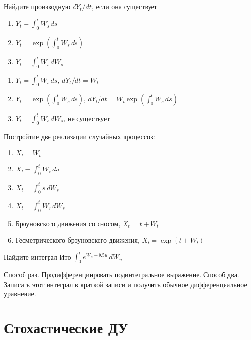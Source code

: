 \begin{problem}
Найдите производную $dY_t/dt$, если она существует
\begin{enumerate}
\item $Y_t=\int_0^t W_s \, ds$
\item $Y_t=\exp (\int_0^t W_s \, ds)$
\item $Y_t=\int_0^t W_s \, dW_s$
\end{enumerate}


\begin{sol}
\begin{enumerate}
\item $Y_t=\int_0^t W_s \, ds$, $dY_t/dt=W_t$
\item $Y_t=\exp (\int_0^t W_s \, ds)$, $dY_t/dt=W_t\exp (\int_0^t W_s \, ds)$
\item $Y_t=\int_0^t W_s \, dW_s$, не существует
\end{enumerate}
\end{sol}
\end{problem}

\begin{problem}
Постройтие две реализации случайных процессов:
\begin{enumerate}
\item $X_t=W_t$
\item $X_t=\int_0^t W_s \, ds$
\item $X_t=\int_0^t s \, dW_s$
\item $X_t=\int_0^t W_s \, dW_s$
\item Броуновского движения со сносом, $X_t=t+W_t$
\item Геометрического броуновского движения, $X_t=\exp(t+W_t)$
\end{enumerate}


\begin{sol}
\end{sol}
\end{problem}

\begin{problem}
Найдите интеграл Ито $\int_0^t e^{W_u - 0.5 u} \, dW_u$


\begin{sol}
Способ раз. Продифференциировать подинтегральное выражение. Способ два. Записать этот интеграл в краткой записи и получить обычное дифференциальное уравнение.
\end{sol}
\end{problem}

\section{Стохастические ДУ}


